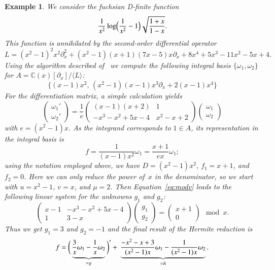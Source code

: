\documentclass[final,1p,times,authoryear]{elsarticle}
\newtheorem{example}[theorem]{Example}
\def\<#1>{\langle#1\rangle}
\newcommand{\bC}{ {\mathbb C}}
\begin{document}
\begin{example}\label{ex:hr}
We consider the fuchsian D-finite function
\[
  \frac{1}{x^2} \log\Bigl(\frac{1}{x^2}-1\Bigr)\sqrt{\frac{1+x}{1-x}}.
\]
This function is annihilated by the second-order differential operator
\[
  L = (x^2-1)^2 x^2 \partial_x^2 + (x^2-1) (x+1) (7x-5) x \partial_x + 
    8x^4+5x^3-11x^2-5x+4.
\]
Using the algorithm described of~\cite{kauers15b} we compute the following
integral basis $\{\omega_1,\omega_2\}$ for $A=\bC(x)[\partial_x]/\<L>$:
\[
  \bigl\{ (x-1) x^2,\, (x^2-1) (x-1) x^3 \partial_x + 2(x-1) x^4 \bigr\}
\]
For the differentiation matrix, a simple calculation yields
\begin{equation}\label{eq:dmat}
  \begin{pmatrix} \omega_1' \\[2pt] \omega_2' \end{pmatrix} =
  \frac{1}{e} \begin{pmatrix} (x-1) (x+2) & 1 \\[2pt] -x^3-x^2+5x-4 & x^2-x+2 \end{pmatrix}
  \begin{pmatrix} \omega_1 \\[2pt] \omega_2 \end{pmatrix}
\end{equation}
with $e=(x^2-1)x$. As the integrand corresponds to $1\in A$, its
representation in the integral basis is
\[
  f = \frac{1}{(x-1)x^2} \omega_1 = \frac{x+1}{ex} \omega_1;
\]
using the notation employed above, we have $D=(x^2-1)x^2$, $f_1=x+1$,
and $f_2=0$. Here we can only reduce the power of~$x$ in the denominator, so
we start with $u=x^2-1$, $v=x$, and $\mu=2$. Then Equation~\eqref{eq:modv} leads
to the following linear system for the unknowns $g_1$ and $g_2$:
\[
  \begin{pmatrix} x-1 & -x^3-x^2+5 x-4 \\ 1 & 3-x \end{pmatrix}
  \begin{pmatrix} g_1 \\ g_2 \end{pmatrix} =
  \begin{pmatrix} x+1 \\ 0 \end{pmatrix} \mod x.
\]
Thus we get $g_1=3$ and $g_2=-1$ and the final result of the Hermite reduction is
\[
f=
  \biggl(\, \underbrace{\vphantom{\frac{1}{(x)}}  \frac{3}{x} \omega_1 - \frac{1}{x} \omega_2}_{=g} \,\biggr)' +\>
  \underbrace{\frac{-x^2-x+3}{(x^2-1)x} \omega_1 - \frac{1}{(x^2-1)x} \omega_2}_{=h}.
\]
\end{example}
\end{document}

